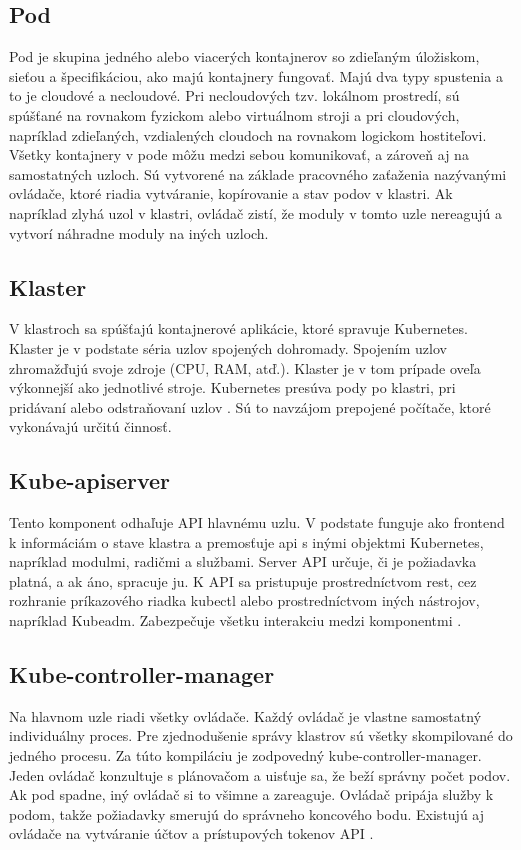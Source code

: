 \subsection*{Pod}
Pod je skupina jedného alebo viacerých kontajnerov so zdieľaným úložiskom, sieťou a špecifikáciou, ako majú kontajnery fungovať. Majú dva typy spustenia a to je cloudové a necloudové. Pri necloudových tzv. lokálnom prostredí, sú spúšťané na rovnakom fyzickom alebo virtuálnom stroji a pri cloudových, napríklad zdieľaných, vzdialených cloudoch na rovnakom logickom hostiteľovi. Všetky kontajnery v pode môžu medzi sebou komunikovať, a zároveň aj na samostatných uzloch. Sú vytvorené na základe pracovného zaťaženia nazývanými ovládače, ktoré riadia vytváranie, kopírovanie a stav podov v klastri. Ak napríklad zlyhá uzol v klastri, ovládač zistí, že moduly v tomto uzle nereagujú a vytvorí náhradne moduly na iných uzloch.

\subsection*{Klaster}
V klastroch sa spúšťajú kontajnerové aplikácie, ktoré spravuje Kubernetes. Klaster je v podstate séria uzlov spojených dohromady. Spojením uzlov zhromažďujú svoje zdroje (CPU, RAM, atď.). Klaster je v tom prípade oveľa výkonnejší ako jednotlivé stroje. Kubernetes presúva pody po klastri, pri pridávaní alebo odstraňovaní uzlov \cite{kubernetes2}. Sú to navzájom prepojené počítače, ktoré vykonávajú určitú činnosť.

\subsection*{Kube-apiserver}
Tento komponent odhaľuje API hlavnému uzlu. V podstate funguje ako frontend k informáciám o stave klastra a premosťuje \acrshort{api} s inými objektmi Kubernetes, napríklad modulmi, radičmi a službami. Server API určuje, či je požiadavka platná, a ak áno, spracuje ju. K API sa pristupuje prostredníctvom \acrshort{rest}, cez rozhranie príkazového riadka kubectl alebo prostredníctvom iných nástrojov, napríklad Kubeadm. Zabezpečuje všetku interakciu medzi komponentmi \cite{kubeapiserver}.

\subsection*{Kube-controller-manager}
Na hlavnom uzle riadi všetky ovládače. Každý ovládač je vlastne samostatný individuálny proces. Pre zjednodušenie správy klastrov sú všetky skompilované do jedného procesu. Za túto kompiláciu je zodpovedný kube-controller-manager. Jeden ovládač konzultuje s plánovačom a uisťuje sa, že beží správny počet podov. Ak pod spadne, iný ovládač si to všimne a zareaguje. Ovládač pripája služby k podom, takže požiadavky smerujú do správneho koncového bodu. Existujú aj ovládače na vytváranie účtov a prístupových tokenov API \cite{kubecontroler}.

